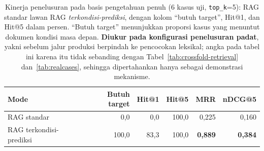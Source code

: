 \begin{table}[htbp]
\centering
\caption{Kinerja penelusuran pada basis pengetahuan penuh (6 kasus uji, \texttt{top\_\allowbreak k}=5): RAG standar lawan RAG \emph{terkondisi-prediksi}, dengan kolom ``butuh target'', Hit@1, dan Hit@5 dalam persen. ``Butuh target'' menunjukkan proporsi kasus yang menuntut dokumen kondisi masa depan. \textbf{Diukur pada konfigurasi penelusuran padat}, yakni sebelum jalur produksi berpindah ke pencocokan leksikal; angka pada tabel ini karena itu tidak sebanding dengan Tabel~\ref{tab:crossfold-retrieval} dan~\ref{tab:realcases}, sehingga dipertahankan hanya sebagai demonstrasi mekanisme.}
\label{tab:kinerja-retrieval}
\small
\begin{tabularx}{\textwidth}{@{}Lrrrrr@{}}
\toprule
\textbf{Mode} & \textbf{Butuh target} & \textbf{Hit@1} & \textbf{Hit@5} & \textbf{MRR} & \textbf{nDCG@5} \\
\midrule
RAG standar & 0,0 & 0,0 & 100,0 & 0,225 & 0,160 \\
RAG terkondisi-prediksi & 100,0 & 83,3 & 100,0 & \textbf{0,889} & \textbf{0,384} \\
\bottomrule
\end{tabularx}
\end{table}
